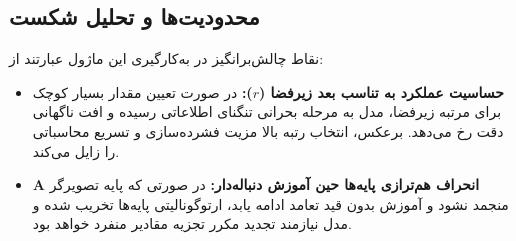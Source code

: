 \subsection{محدودیت‌ها و تحلیل شکست}
نقاط چالش‌برانگیز در به‌کارگیری این ماژول عبارتند از:
\begin{itemize}
    \item \textbf{حساسیت عملکرد به تناسب بعد زیرفضا ($r$):} در صورت تعیین مقدار بسیار کوچک برای مرتبه زیرفضا، مدل به مرحله بحرانی تنگنای اطلاعاتی رسیده و افت ناگهانی دقت رخ می‌دهد. برعکس، انتخاب رتبه بالا مزیت فشرده‌سازی و تسریع محاسباتی را زایل می‌کند.
    \item \textbf{انحراف هم‌ترازی پایه‌ها حین آموزش دنباله‌دار:} در صورتی که پایه تصویرگر $\mathbf{A}$ منجمد نشود و آموزش بدون قید تعامد ادامه یابد، ارتوگونالیتی پایه‌ها تخریب شده و مدل نیازمند تجدید مکرر تجزیه مقادیر منفرد خواهد بود.
\end{itemize}
